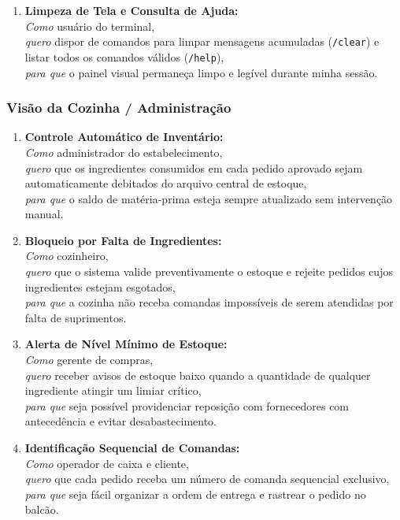 \documentclass[12pt]{article}
\begin{document}
\begin{enumerate}
    \item[\textbf{US06}] \textbf{Limpeza de Tela e Consulta de Ajuda:} \\
    \textit{Como} usuário do terminal, \\
    \textit{quero} dispor de comandos para limpar mensagens acumuladas (\texttt{/clear}) e listar todos os comandos válidos (\texttt{/help}), \\
    \textit{para que} o painel visual permaneça limpo e legível durante minha sessão.
\end{enumerate}

\subsubsection{Visão da Cozinha / Administração}

\begin{enumerate}
    \item[\textbf{US07}] \textbf{Controle Automático de Inventário:} \\
    \textit{Como} administrador do estabelecimento, \\
    \textit{quero} que os ingredientes consumidos em cada pedido aprovado sejam automaticamente debitados do arquivo central de estoque, \\
    \textit{para que} o saldo de matéria-prima esteja sempre atualizado sem intervenção manual.

    \item[\textbf{US08}] \textbf{Bloqueio por Falta de Ingredientes:} \\
    \textit{Como} cozinheiro, \\
    \textit{quero} que o sistema valide preventivamente o estoque e rejeite pedidos cujos ingredientes estejam esgotados, \\
    \textit{para que} a cozinha não receba comandas impossíveis de serem atendidas por falta de suprimentos.

    \item[\textbf{US09}] \textbf{Alerta de Nível Mínimo de Estoque:} \\
    \textit{Como} gerente de compras, \\
    \textit{quero} receber avisos de estoque baixo quando a quantidade de qualquer ingrediente atingir um limiar crítico, \\
    \textit{para que} seja possível providenciar reposição com fornecedores com antecedência e evitar desabastecimento.

    \item[\textbf{US10}] \textbf{Identificação Sequencial de Comandas:} \\
    \textit{Como} operador de caixa e cliente, \\
    \textit{quero} que cada pedido receba um número de comanda sequencial exclusivo, \\
    \textit{para que} seja fácil organizar a ordem de entrega e rastrear o pedido no balcão.
\end{enumerate}
\end{document}

